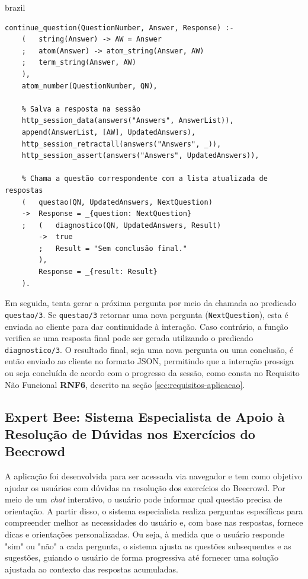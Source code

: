 \begin{otherlanguage*}{brazil}
\begin{lstlisting}[style=ufscthesisx_style, caption={Arquivo \textit{server.pl} - \textit{Handlers} e Manipuladores de requisições}]
continue_question(QuestionNumber, Answer, Response) :-
    (   string(Answer) -> AW = Answer
    ;   atom(Answer) -> atom_string(Answer, AW)
    ;   term_string(Answer, AW)
    ),
    atom_number(QuestionNumber, QN), 

    % Salva a resposta na sessão
    http_session_data(answers("Answers", AnswerList)),
    append(AnswerList, [AW], UpdatedAnswers),
    http_session_retractall(answers("Answers", _)),
    http_session_assert(answers("Answers", UpdatedAnswers)),

    % Chama a questão correspondente com a lista atualizada de respostas
    (   questao(QN, UpdatedAnswers, NextQuestion)
    ->  Response = _{question: NextQuestion}
    ;   (   diagnostico(QN, UpdatedAnswers, Result)
        ->  true
        ;   Result = "Sem conclusão final."
        ),
        Response = _{result: Result}
    ).
\end{lstlisting}

Em seguida, tenta gerar a próxima pergunta por meio da chamada ao predicado \texttt{questao/3}. Se \texttt{questao/3} retornar uma nova pergunta (\texttt{NextQuestion}), esta é enviada ao cliente para dar continuidade à interação. Caso contrário, a função verifica se uma resposta final pode ser gerada utilizando o predicado \texttt{diagnostico/3}. O resultado final, seja uma nova pergunta ou uma conclusão, é então enviado ao cliente no formato JSON, permitindo que a interação prossiga ou seja concluída de acordo com o progresso da sessão, como consta no Requisito Não Funcional \textbf{RNF6}, descrito na seção \ref{sec:requisitos-aplicacao}.

\subsection{Expert Bee: Sistema Especialista de Apoio à Resolução de Dúvidas nos Exercícios do Beecrowd}

A aplicação foi desenvolvida para ser acessada via navegador e tem como objetivo ajudar os usuários com dúvidas na resolução dos exercícios do Beecrowd. Por meio de um \textit{chat} interativo, o usuário pode informar qual questão precisa de orientação. A partir disso, o sistema especialista realiza perguntas específicas para compreender melhor as necessidades do usuário e, com base nas respostas, fornece dicas e orientações personalizadas. Ou seja, à medida que o usuário responde "sim" ou "não" a cada pergunta, o sistema ajusta as questões subsequentes e as sugestões, guiando o usuário de forma progressiva até fornecer uma solução ajustada ao contexto das respostas acumuladas.


\end{otherlanguage*}
